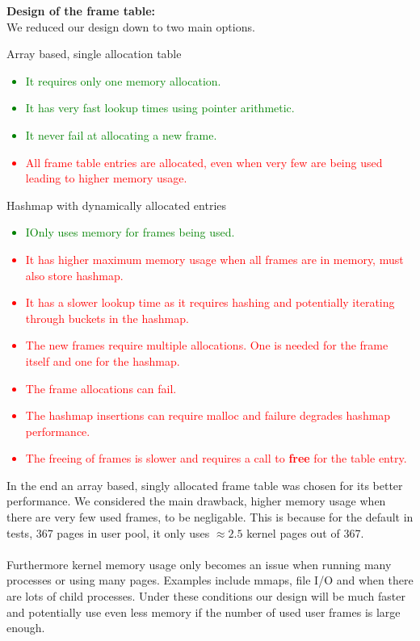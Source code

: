 \documentclass{report}
\newcommand{\fun}[1]{\textcolor{Emerald}{\textbf{#1}}}
\newcommand{\compitem}[1]{\begin{itemize}\setlength\itemsep{-0.1em}#1\end{itemize}}
\begin{document}
				\textbf{Design of the frame table:}
				\\ We reduced our design down to two main options.
				\\ \begin{minipage}[t]{0.45\textwidth}
					\centerline{Array based, single allocation table}
					\textcolor{green}{
						\compitem{
							\item It requires only one memory allocation.
							\item It has very fast lookup times using pointer
							arithmetic.
							\item It never fail at allocating a new frame.
						}
					}
					\textcolor{red}{
						\compitem{
							\item All frame table entries are allocated, even 
							when very few are being used leading to higher 
							memory usage.
						}
					}
				\end{minipage}
				\hfill
				\begin{minipage}[t]{0.45\textwidth}
					\centerline{Hashmap with dynamically allocated entries}
					\textcolor{green}{
						\compitem{
							\item IOnly uses memory for frames being used.
						}
					}
					\textcolor{Red}{
						\compitem{
							\item It has higher maximum memory usage when all 
							frames are in memory, must also store hashmap.
							\item It has a slower lookup time as it requires 
							hashing and potentially iterating through buckets 
							in the hashmap.
							\item The new frames require multiple allocations.  
							One is needed for the frame itself and one for
							the hashmap.
							\item The frame allocations can fail.
							\item The hashmap insertions can require malloc and 
							failure degrades hashmap performance.
							\item The freeing of frames is slower and 
							requires a call to \fun{free} for the table entry.
						}
					}
				\end{minipage}
				In the end an array based, singly allocated frame table was 
				chosen for its better performance. We considered the main 
				drawback, higher memory usage when there 
				are very few used frames, to be negligable. This is because for
				the default in tests, 367 pages in user pool, it only uses 
				$\approx 2.5$ kernel pages out of 367.
				\\
				\\ Furthermore kernel memory usage only becomes an issue when 
				running many processes or using many pages. Examples include
				mmaps, file I/O and when there are lots of child processes. 
				Under these conditions our design will be much faster and 
				potentially use even less memory if the number of used user 
				frames is large enough.
				
\end{document}
